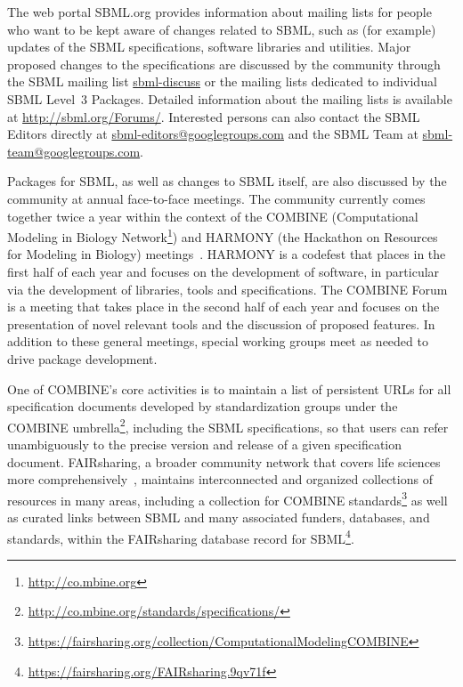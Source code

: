 \documentclass[]{draft-sbml-paper}
\begin{document}
The web portal SBML.org provides information about mailing lists for people who want to be kept aware of changes related to SBML, such as (for example) updates of the SBML specifications, software libraries and utilities.  Major proposed changes to the specifications are discussed by the community through the SBML mailing list \url{sbml-discuss} or the mailing lists dedicated to individual SBML Level~3 Packages.  Detailed information about the mailing lists is available at \url{http://sbml.org/Forums/}. Interested persons can also contact the SBML Editors directly at \url{sbml-editors@googlegroups.com} and the SBML Team at \url{sbml-team@googlegroups.com}.

Packages for SBML, as well as changes to SBML itself, are also discussed by the community at annual face-to-face meetings.  The community currently comes together twice a year within the context of the COMBINE (Computational Modeling in Biology Network\footnote{\url{http://co.mbine.org}}) and HARMONY (the Hackathon on Resources for Modeling in Biology) meetings~\citep{Hucka2015promotinga}.  HARMONY is a codefest that places in the first half of each year and focuses on the development of software, in particular via the development of libraries, tools and specifications.  The COMBINE Forum is a meeting that takes place in the second half of each year and focuses on the presentation of novel relevant tools and the discussion of proposed features.  In addition to these general meetings, special working groups meet as needed to drive package development.

One of COMBINE's core activities is to maintain a list of persistent URLs for all specification documents developed by standardization groups under the COMBINE umbrella\footnote{\url{http://co.mbine.org/standards/specifications/}}, including the SBML specifications, so that users can refer unambiguously to the precise version and release of a given specification document.  FAIRsharing, a broader community network that covers life sciences more comprehensively~\citep{Sansone2019fairsharing}, maintains interconnected and organized collections of resources in many areas, including a collection for COMBINE standards\footnote{\url{https://fairsharing.org/collection/ComputationalModelingCOMBINE}} as well as curated links between SBML and many associated funders, databases, and standards, within the FAIRsharing database record for SBML\footnote{\url{https://fairsharing.org/FAIRsharing.9qv71f}}.

\clearpage
\newpage
\end{document}
